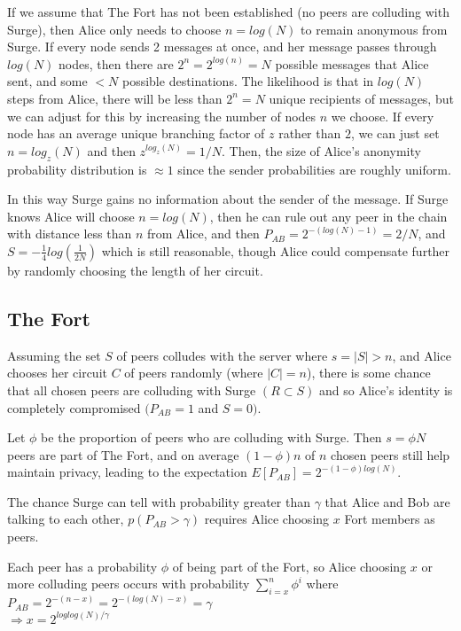 \documentclass[twocolumn,11pt,english]{paper}
\begin{document}
If we assume that The Fort has not been established (no peers are colluding with Surge), then Alice only needs to choose $n = log(N)$ to remain anonymous from Surge. If every node sends 2 messages at once, and her message passes through $log(N)$ nodes, then there are $2^n = 2^{log(n)} = N$ possible messages that Alice sent, and some $< N$ possible destinations. The likelihood is that in $log(N)$ steps from Alice, there will be less than $2^n = N$ unique recipients of messages, but we can adjust for this by increasing the number of nodes $n$ we choose. If every node has an average unique branching factor of $z$ rather than $2$, we can just set $n = log_z(N)$ and then $z^{log_z(N)} = 1/N$. Then, the size of Alice's anonymity probability distribution is $\approx 1$ since the sender probabilities are roughly uniform.

In this way Surge gains no information about the sender of the message. If Surge knows Alice will choose $n = log(N)$, then he can rule out any peer in the chain with distance less than $n$ from Alice, and then $P_{AB} = 2^{-(log(N)-1)} = 2/N$, and $S = - \frac{1}{4} log(\frac{1}{2N})$ which is still reasonable, though Alice could compensate further by randomly choosing the length of her circuit. 

\subsection{The Fort} Assuming the set $S$ of peers colludes with the server where $s = |S| > n$, and Alice chooses her circuit $C$ of peers randomly (where $|C| = n$), there is some chance that all chosen peers are colluding with Surge $(R \subset S)$ and so Alice's identity is completely compromised $(P_{AB} = 1$ and $S = 0)$. 

Let $\phi$ be the proportion of peers who are colluding with Surge. Then $s = \phi N$ peers are part of The Fort, and on average $(1 - \phi)n$ of $n$ chosen peers still help maintain privacy, leading to the expectation $E[P_{AB}] = 2^{-(1 - \phi) log(N)}$. 

The chance Surge can tell with probability greater than $\gamma$ that Alice and Bob are talking to each other, $p(P_{AB} > \gamma)$ requires Alice choosing $x$ Fort members as peers. 

Each peer has a probability $\phi$ of being part of the Fort, so Alice choosing $x$ or more colluding peers occurs with probability $\sum\limits_{i=x}^n\phi^i$ where 
\\ $P_{AB} = 2^{-(n - x)} = 2^{-(log(N) - x)} = \gamma$
\\ $ \Rightarrow x = 2^{loglog(N)/\gamma}$
\end{document}
